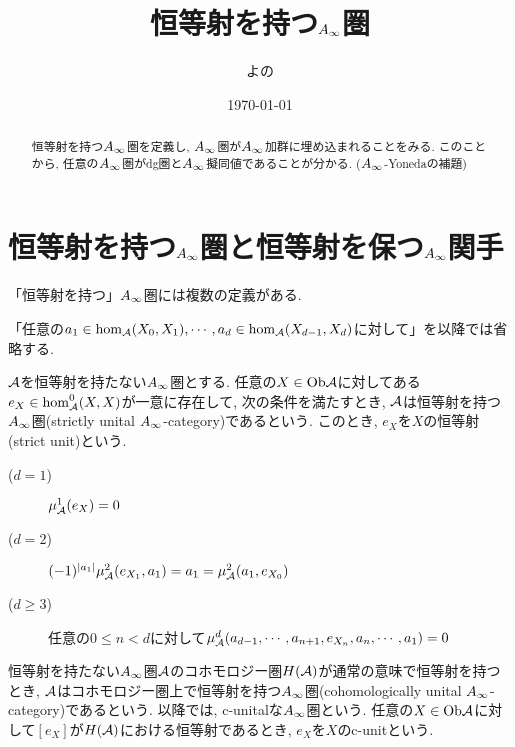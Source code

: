 \documentclass[uplatex, a4paper, 14Q, dvipdfmx]{jsarticle}
\title{恒等射を持つ\texorpdfstring{$A_{\infty}$}{Ainf}圏}
\author{よの}
\date{\today}
\begin{document}
\maketitle

\begin{abstract}
  恒等射を持つ$A_{\infty}$圏を定義し, $A_{\infty}$圏が$A_{\infty}$加群に埋め込まれることをみる. 
  このことから, 任意の$A_{\infty}$圏がdg圏と$A_{\infty}$擬同値であることが分かる. ($A_{\infty}$-Yonedaの補題)
\end{abstract}

\tableofcontents

\section{恒等射を持つ\texorpdfstring{$A_{\infty}$}{Ainf}圏と恒等射を保つ\texorpdfstring{$A_{\infty}$}{Ainf}関手}

「恒等射を持つ」$A_{\infty}$圏には複数の定義がある.

「任意の$a_1 \in \hom_{\mathcal{A}}(X_0,X_1), \cdots, a_d \in \hom_{\mathcal{A}}(X_{d-1},X_d)$に対して」を以降では省略する. 

\begin{definition}
  $\mathcal{A}$を恒等射を持たない$A_{\infty}$圏とする. 
  任意の$X \in \mathrm{Ob}\mathcal{A}$に対してある$e_X \in \hom_{\mathcal{A}}^0(X,X)$が一意に存在して, 次の条件を満たすとき, $\mathcal{A}$は恒等射を持つ$A_{\infty}$圏(strictly unital $A_{\infty}$-category)であるという. 
  このとき, $e_X$を$X$の恒等射(strict unit)という.
  \begin{description}
    \item[($d=1$)] $\mu^1_{\mathcal{A}}(e_X) = 0$ 
    \item[($d=2$)] $(-1)^{|a_1|} \mu^2_{\mathcal{A}}(e_{X_1},a_1) = a_1 = \mu^2_{\mathcal{A}}(a_1,e_{X_0})$
    \item[($d \geq 3$)] 任意の$0 \leq n < d$に対して$\mu^d_{\mathcal{A}}(a_{d-1},\cdots,a_{n+1},e_{X_n},a_n,\cdots,a_1) = 0$
  \end{description}
\end{definition}

\begin{definition}
  恒等射を持たない$A_{\infty}$圏$\mathcal{A}$のコホモロジー圏$H(\mathcal{A})$が通常の意味で恒等射を持つとき, $\mathcal{A}$はコホモロジー圏上で恒等射を持つ$A_{\infty}$圏(cohomologically unital $A_{\infty}$-category)であるという. 
  以降では, c-unitalな$A_{\infty}$圏という. 
  任意の$X \in \mathrm{Ob}\mathcal{A}$に対して$[e_X]$が$H(\mathcal{A})$における恒等射であるとき, $e_X$を$X$のc-unitという.
\end{definition}
\end{document}
